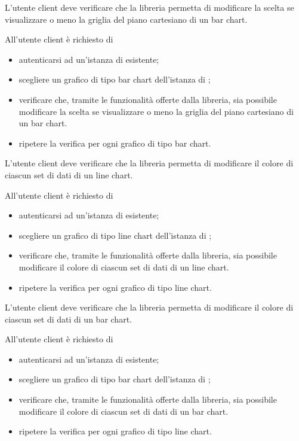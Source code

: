 	L'utente client deve verificare che la libreria permetta di modificare la scelta se visualizzare o meno la griglia del piano cartesiano di un bar chart.
		
		All'utente client è richiesto di
		\begin{itemize}
			\item autenticarsi ad un'istanza di \projectname{} esistente;
			\item scegliere un grafico di tipo bar chart dell'istanza di \projectname{};
			\item verificare che, tramite le funzionalità offerte dalla libreria, sia possibile modificare la scelta se visualizzare o meno la griglia del piano cartesiano di un bar chart.
			\item ripetere la verifica per ogni grafico di tipo bar chart.
		\end{itemize}

	L'utente client deve verificare che la libreria permetta di modificare il colore di ciascun set di dati di un line chart.
		
		All'utente client è richiesto di
		\begin{itemize}
			\item autenticarsi ad un'istanza di \projectname{} esistente;
			\item scegliere un grafico di tipo line chart dell'istanza di \projectname{};
			\item verificare che, tramite le funzionalità offerte dalla libreria, sia possibile modificare il colore di ciascun set di dati di un line chart.
			\item ripetere la verifica per ogni grafico di tipo line chart.
		\end{itemize}

	L'utente client deve verificare che la libreria permetta di modificare il colore di ciascun set di dati di un bar chart.
		
		All'utente client è richiesto di
		\begin{itemize}
			\item autenticarsi ad un'istanza di \projectname{} esistente;
			\item scegliere un grafico di tipo bar chart dell'istanza di \projectname{};
			\item verificare che, tramite le funzionalità offerte dalla libreria, sia possibile modificare il colore di ciascun set di dati di un bar chart.
			\item ripetere la verifica per ogni grafico di tipo line chart.
		\end{itemize}

